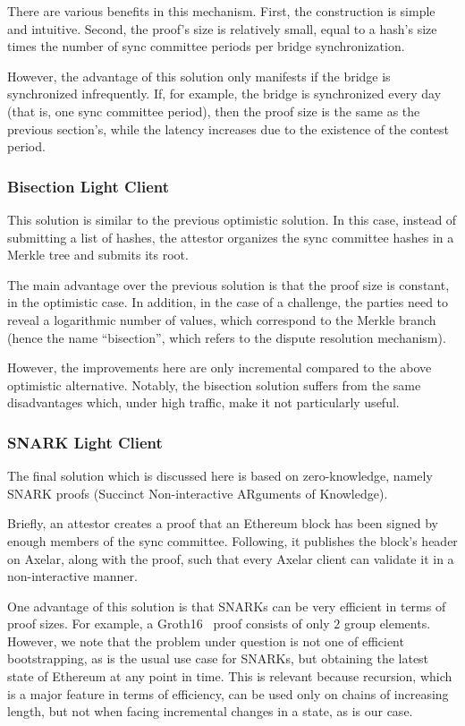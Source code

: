 There are various benefits in this mechanism. First, the construction is simple
and intuitive. Second, the proof's size is relatively small, equal to a hash's
size times the number of sync committee periods per bridge synchronization.

However, the advantage of this solution only manifests if the bridge is
synchronized infrequently. If, for example, the bridge is synchronized every
day (that is, one sync committee period), then the proof size is the same as the
previous section's, while the latency increases due to the existence of the contest period.

\subsubsection{Bisection Light Client}

This solution is similar to the previous optimistic solution. In this case,
instead of submitting a list of hashes, the attestor organizes the sync
committee hashes in a Merkle tree and submits its root.

The main advantage over the previous solution is that the proof size is
constant, in the optimistic case. In addition, in the case of a challenge, the
parties need to reveal a logarithmic number of values, which correspond to the
Merkle branch (hence the name ``bisection'', which refers to the dispute
resolution mechanism).

However, the improvements here are only incremental compared to the above
optimistic alternative. Notably, the bisection solution suffers from the same
disadvantages which, under high traffic, make it not particularly useful.

\subsubsection{SNARK Light Client}

The final solution which is discussed here is based on zero-knowledge, namely
SNARK proofs (Succinct Non-interactive ARguments of Knowledge).

Briefly, an attestor creates a proof that an Ethereum block has been signed by
enough members of the sync committee. Following, it publishes the block's
header on Axelar, along with the proof, such that every Axelar client can
validate it in a non-interactive manner.

One advantage of this solution is that SNARKs can be very efficient in terms of
proof sizes. For example, a Groth16~\cite{EC:Groth16} proof consists of only
$2$ group elements. However, we note that the problem under question is not one
of efficient bootstrapping, as is the usual use case for SNARKs, but obtaining
the latest state of Ethereum at any point in time. This is relevant because
recursion, which is a major feature in terms of efficiency, can be used only on
chains of increasing length, but not when facing incremental changes in a
state, as is our case.

